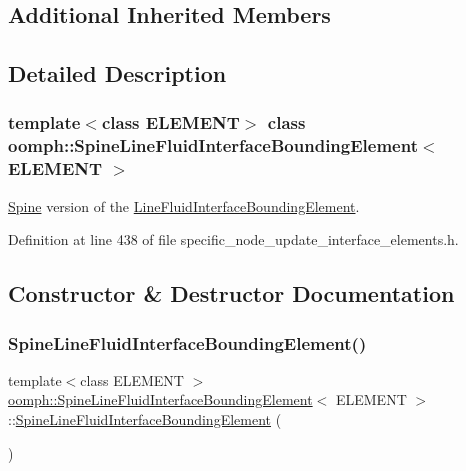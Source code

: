 \subsection*{Additional Inherited Members}


\subsection{Detailed Description}
\subsubsection*{template$<$class E\+L\+E\+M\+E\+NT$>$\newline
class oomph\+::\+Spine\+Line\+Fluid\+Interface\+Bounding\+Element$<$ E\+L\+E\+M\+E\+N\+T $>$}

\hyperlink{classoomph_1_1Spine}{Spine} version of the \hyperlink{classoomph_1_1LineFluidInterfaceBoundingElement}{Line\+Fluid\+Interface\+Bounding\+Element}. 

Definition at line 438 of file specific\+\_\+node\+\_\+update\+\_\+interface\+\_\+elements.\+h.



\subsection{Constructor \& Destructor Documentation}
\mbox{\label{classoomph_1_1SpineLineFluidInterfaceBoundingElement_a27c79d149485d2269ed42136914635e1}} 
\subsubsection{\texorpdfstring{Spine\+Line\+Fluid\+Interface\+Bounding\+Element()}{SpineLineFluidInterfaceBoundingElement()}}
{\footnotesize\ttfamily template$<$class E\+L\+E\+M\+E\+NT $>$ \\
\hyperlink{classoomph_1_1SpineLineFluidInterfaceBoundingElement}{oomph\+::\+Spine\+Line\+Fluid\+Interface\+Bounding\+Element}$<$ E\+L\+E\+M\+E\+NT $>$\+::\hyperlink{classoomph_1_1SpineLineFluidInterfaceBoundingElement}{Spine\+Line\+Fluid\+Interface\+Bounding\+Element} (\begin{DoxyParamCaption}{ }\end{DoxyParamCaption})\hspace{0.3cm}{\ttfamily [inline]}}



